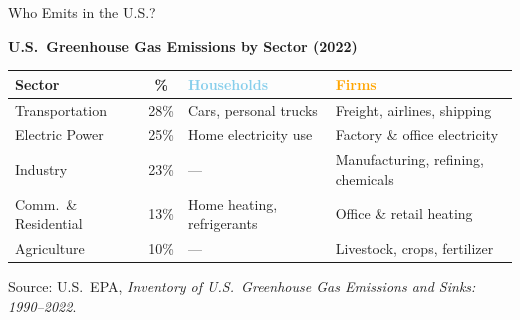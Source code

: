 \documentclass[9pt,english,aspectratio=169]{beamer}
\begin{document}
\begin{frame}{Who Emits in the U.S.?}

  \textbf{U.S.\ Greenhouse Gas Emissions by Sector (2022)}
  \centering
  \vspace{0.3em}
  {\small
  \begin{tabular}{@{} l c p{3.2cm} p{3.2cm} @{}}
    \toprule
    \textbf{Sector} & \textbf{\%} & \textcolor{skyblue}{\textbf{Households}} & \textcolor{orange}{\textbf{Firms}} \\
    \midrule
    Transportation & 28\% &
      Cars, personal trucks &
      Freight, airlines, shipping \\[0.4em]
    Electric Power & 25\% &
      Home electricity use &
      Factory \& office electricity \\[0.4em]
    Industry & 23\% &
      --- &
      Manufacturing, refining, chemicals \\[0.4em]
    Comm.\ \& Residential & 13\% &
      Home heating, refrigerants &
      Office \& retail heating \\[0.4em]
    Agriculture & 10\% &
      --- &
      Livestock, crops, fertilizer \\
    \bottomrule
  \end{tabular}
  }


  \vspace{0.2em}
  {\tiny Source: U.S.\ EPA, \textit{Inventory of U.S.\ Greenhouse Gas Emissions and Sinks: 1990--2022}.}

\end{frame}
\end{document}
